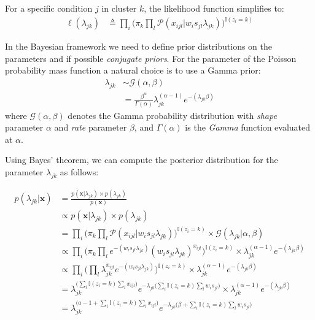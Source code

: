 For a specific condition $j$ in cluster $k$, the likelihood function simplifies to:
\begin{equation} \label{poisson-log-lin-mm-jk-app}
  \begin{split}
	\ell(\lambda_{jk}) & \triangleq \prod_{i} \bigg( \pi_{k} \prod_{l} \mathcal{P}(x_{ijl} | w_{i}s_{jl} \lambda_{jk})\bigg)^{\mathbb{I}(z_{i}=k)}
  \end{split}
\end{equation}

In the Bayesian framework we need to define prior distributions on the parameters and if possible \emph{conjugate priors}. For the parameter of the Poisson probability mass function a natural choice is to use a Gamma prior:
\begin{equation} \label{poisson-prior-mm-app}
  \begin{split}
  \lambda_{jk} & \sim \mathcal{G}(\alpha, \beta) \\
  	& = \frac{\beta^{\alpha}}{\Gamma(\alpha)}\lambda_{jk}^{(\alpha-1)} e^{-(\lambda_{jk}\beta)}
    \end{split}
\end{equation}
where $\mathcal{G}(\alpha, \beta)$ denotes the Gamma probability distribution with \emph{shape} parameter $\alpha$ and \emph{rate} parameter $\beta$, and $\Gamma(\alpha)$ is the \emph{Gamma} function evaluated at $\alpha$.

Using Bayes' theorem, we can compute the posterior distribution for the parameter $\lambda_{jk}$ as follows:

\begin{equation} \label{posterior-poisson-bayes-rule-app}
  \begin{split}
  	p(\lambda_{jk} | \mathbf{x}) & = \frac{p(\mathbf{x}| \lambda_{jk}) \times p(\lambda_{jk})}{p(\mathbf{x})} \\
  		& \propto p(\mathbf{x}| \lambda_{jk}) \times p(\lambda_{jk}) \\
  		& = \prod_{i} \bigg(\pi_{k} \prod_{l} \mathcal{P}(x_{ijl} | w_{i}s_{jl} \lambda_{jk})\bigg)^{\mathbb{I}(z_{i}=k)} \times \mathcal{G}(\lambda_{jk}|\alpha, \beta) \\
  		& \propto \prod_{i} \bigg(\pi_{k} \prod_{l} e^{-(w_{i}s_{jl}\lambda_{jk})} (w_{i}s_{jl}\lambda_{jk})^{x_{ijl}}\bigg)^{\mathbb{I}(z_{i}=k)} \times \lambda_{jk}^{(\alpha-1)} e^{-(\lambda_{jk}\beta)} \\
  		& \propto \prod_{i} \bigg( \prod_{l} \lambda_{jk}^{x_{ijl}} e^{-(w_{i}s_{jl}\lambda_{jk})}\bigg)^{\mathbb{I}(z_{i}=k)} \times \lambda_{jk}^{(\alpha-1)} e^{-(\lambda_{jk}\beta)} \\
  		& = \lambda_{jk}^{\big(\sum\limits_{i} \mathbb{I}(z_{i}=k) \sum\limits_{l} x_{ijl}\big)} e^{-\lambda_{jk}\big(\sum\limits_{i} \mathbb{I}(z_{i}=k) \sum\limits_{l} w_{i}s_{jl}\big)} \times \lambda_{jk}^{(\alpha-1)} e^{-(\lambda_{jk}\beta)} \\
		& = \lambda_{jk}^{\big(a - 1 + \sum\limits_{i} \mathbb{I}(z_{i}=k) \sum\limits_{l} x_{ijl}\big)} e^{-\lambda_{jk}\big(\beta + \sum\limits_{i} \mathbb{I}(z_{i}=k) \sum\limits_{l} w_{i}s_{jl} \big)}
  \end{split}
\end{equation}

